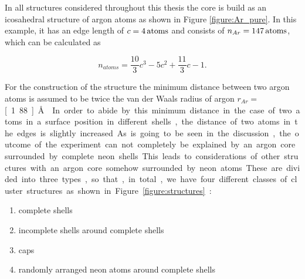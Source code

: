In all structures considered throughout this thesis the core is build as
 an icosahedral
structure of argon atoms as shown in Figure \ref{figure:Ar_pure}.
In this example, it has an edge length
of $c=\unit[4]{atoms}$ and consists of $n_{Ar}=\unit[147]{atoms}$, which can be
calculated as \cite{Martin96}

\begin{equation}
  n_{atoms} = \frac{10}{3} c^3 - 5 c^2 + \frac{11}{3} c -1 .
\end{equation}

For the construction of the structure the minimum
distance between two argon
atoms is assumed to be twice the van der Waals
radius of argon $r_{Ar}=$ \unit[1.88]{\AA} \cite{Bondi64}. In order to abide by this
minimum distance in the case of two atoms in a surface position in different
shells, the distance of two atoms in the edges is slightly increased.

As is going to be seen in the discussion, the outcome of the experiment
can not completely be explained by an argon core surrounded by complete neon shells.
This leads to considerations of other structures with an argon core somehow surrounded
by neon atoms. These are divided into three types, so that, in total, we have four
different classes of cluster structures as shown in Figure \ref{figure:structures}:

\begin{enumerate}
 \item complete shells
 \item incomplete shells around complete shells
 \item caps
 \item randomly arranged neon atoms around complete shells
\end{enumerate}

